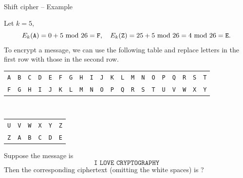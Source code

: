\begin{frame}{Shift cipher -- Example}
\begin{example}
Let $k=5$, 
\[
E_k(\texttt{A})=0+5\textrm{~mod~} 26=\texttt{F},\quad E_k(\texttt{Z})=25+5\textrm{~mod~} 26=4\textrm{~mod~} 26=\texttt{E}.
\]
To encrypt a message, we can use the following table and replace letters in the first row with those in the second row.
\begin{table}
\centering
\begin{tabular}{cccccccccccccccccccc}
\texttt{A} & \texttt{B}& \texttt{C} & \texttt{D} & \texttt{E} & \texttt{F}  & \texttt{G} & \texttt{H} & \texttt{I} & \texttt{J} & \texttt{K}  & \texttt{L}  & \texttt{M}  & \texttt{N}  & \texttt{O}  & \texttt{P}  & \texttt{Q}   & \texttt{R}  & \texttt{S}  & \texttt{T}   \\
\texttt{F}  & \texttt{G} & \texttt{H} & \texttt{I} & \texttt{J} & \texttt{K} & \texttt{L} & \texttt{M} & \texttt{N} & \texttt{O} & \texttt{P} & \texttt{Q}  & \texttt{R} & \texttt{S} & \texttt{T} & \texttt{U} & \texttt{V} & \texttt{W} & \texttt{X} & \texttt{Y} 
\end{tabular}\\\vspace{0.3cm}
\begin{tabular}{cccccc}
 \texttt{U}  & \texttt{V}  & \texttt{W}  & \texttt{X}  & \texttt{Y}  & \texttt{Z}  \\
\texttt{Z} & \texttt{A} & \texttt{B}& \texttt{C} & \texttt{D} & \texttt{E}
\end{tabular}
\end{table}
Suppose the message is 
\[
\texttt{I LOVE CRYPTOGRAPHY}
\]
Then the corresponding ciphertext (omitting the white spaces) is ?
\end{example}
\end{frame}

